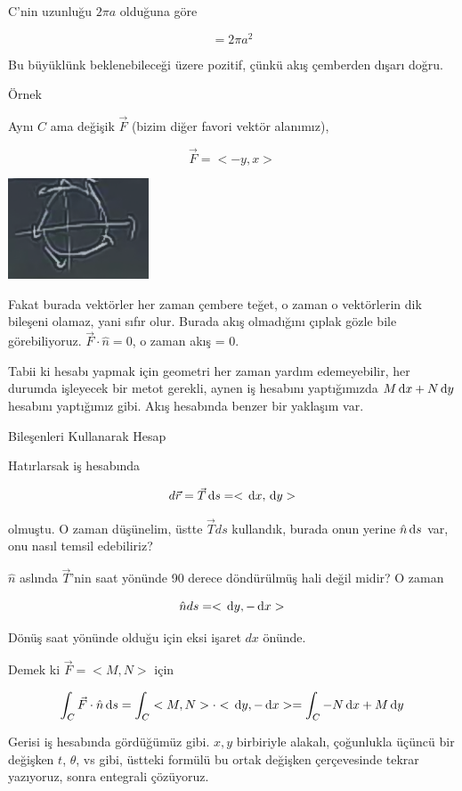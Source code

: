 \documentclass[12pt,fleqn]{article}\usepackage{../../common}
\begin{document}
C'nin uzunluğu $2\pi a$ olduğuna göre

$$ = 2\pi a^2 $$

Bu büyüklünk beklenebileceği üzere pozitif, çünkü akış çemberden dışarı
doğru. 

Örnek

Aynı $C$ ama değişik $\vec{F}$ (bizim diğer favori vektör alanımız), 

$$ \vec{F} = < -y,x > $$
\begin{center}
\includegraphics[height=3cm]{23_7.png}
\end{center}
Fakat burada vektörler her zaman çembere teğet, o zaman o vektörlerin dik
bileşeni olamaz, yani sıfır olur. Burada akış olmadığını çıplak gözle bile
görebiliyoruz. $\vec{F} \cdot \hat{n} = 0$, o zaman akış = 0. 

Tabii ki hesabı yapmak için geometri her zaman yardım edemeyebilir, her durumda
işleyecek bir metot gerekli, aynen iş hesabını yaptığımızda $M \,\mathrm{d} x + N \,\mathrm{d} y$
hesabını yaptığımız gibi. Akış hesabında benzer bir yaklaşım var.

Bileşenleri Kullanarak Hesap

Hatırlarsak iş hesabında 

$$ d\vec{r} = \vec{T} \,\mathrm{d} s = < \,\mathrm{d} x, \,\mathrm{d} y > $$

olmuştu. O zaman düşünelim, üstte $\vec{T} ds$ kullandık, burada onun
yerine $\hat{n} \,\mathrm{d} s$ var, onu nasıl temsil edebiliriz? 

$\hat{n}$ aslında $\vec{T}$'nin saat yönünde 90 derece döndürülmüş hali
değil midir? O zaman 

$$ \hat{n}ds = < \,\mathrm{d} y,-\,\mathrm{d} x > $$

Dönüş saat yönünde olduğu için eksi işaret $dx$ önünde. 

Demek ki $\vec{F} = < M,N >$ için

$$
\int_C \vec{F} \cdot \hat{n} \,\mathrm{d} s =
\int_C  < M,N > \cdot < \,\mathrm{d} y,-\,\mathrm{d} x > =  \int_C -N \,\mathrm{d} x + M \,\mathrm{d} y
$$

Gerisi iş hesabında gördüğümüz gibi. $x,y$ birbiriyle alakalı, çoğunlukla
üçüncü bir değişken $t$, $\theta$, vs gibi, üstteki formülü bu ortak
değişken çerçevesinde tekrar yazıyoruz, sonra entegrali çözüyoruz. 
\end{document}
